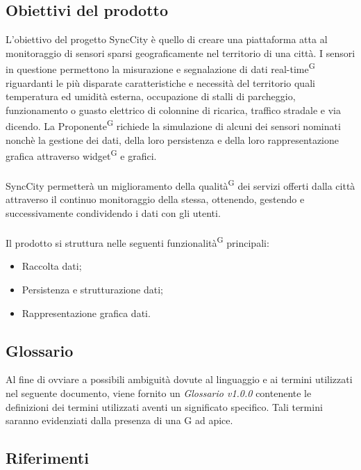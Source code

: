 \documentclass[8pt]{article}
\newcommand{\glossterm}[1]{#1\textsuperscript{G}} %
\begin{document}
\subsection{Obiettivi del prodotto}
L'obiettivo del progetto SyncCity è quello di creare una piattaforma atta al monitoraggio
di sensori sparsi geograficamente nel territorio di una città. I sensori in questione
permettono la misurazione e segnalazione di dati \glossterm{real-time} riguardanti le più disparate
caratteristiche e necessità del territorio quali temperatura ed umidità esterna, occupazione di
stalli di parcheggio, funzionamento o guasto elettrico di colonnine di ricarica, traffico stradale e via
dicendo. La \glossterm{Proponente} richiede la simulazione di alcuni dei sensori nominati nonchè la
gestione dei dati, della loro persistenza e della loro rappresentazione grafica attraverso
\glossterm{widget} e
grafici. \\\\SyncCity permetterà un miglioramento della \glossterm{qualità} dei servizi offerti dalla città attraverso il continuo monitoraggio della stessa, ottenendo, gestendo e successivamente condividendo i dati con gli utenti. 
\\\\
Il prodotto si struttura nelle seguenti \glossterm{funzionalità} principali:
\begin{itemize}
	\setlength\itemsep{0em}
	\item Raccolta dati;
	\item Persistenza e strutturazione dati;
	\item Rappresentazione grafica dati.
\end{itemize}
\subsection{Glossario}
Al fine di ovviare a possibili ambiguità dovute al linguaggio e ai termini utilizzati nel seguente
documento, viene fornito un \textit{Glossario v1.0.0} contenente le definizioni dei termini utilizzati aventi un significato specifico. Tali termini saranno evidenziati dalla presenza di una G ad apice.
\subsection{Riferimenti}
\end{document}

